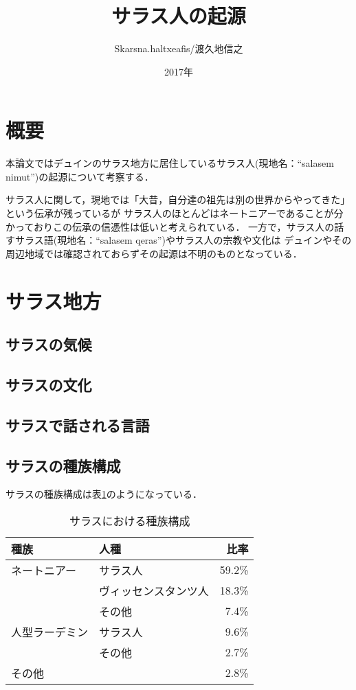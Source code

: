 \documentclass[a4paper,xelatex,ja=standard]{bxjsarticle}
\begin{document}
{
\title{\Huge サラス人の起源}
\author{Skarsna.haltxeafis/渡久地信之}
\date{2017年}
}
\maketitle
\thispagestyle{empty}


\newpage

\tableofcontents

\newpage
{}

\section{概要}
本論文ではデュインのサラス地方に居住しているサラス人(現地名：``salasem nimut'')の起源について考察する．

サラス人に関して，現地では「大昔，自分達の祖先は別の世界からやってきた」という伝承が残っているが
サラス人のほとんどはネートニアーであることが分かっておりこの伝承の信憑性は低いと考えられている．
一方で，サラス人の話すサラス語(現地名：``salasem qeras'')やサラス人の宗教や文化は
デュインやその周辺地域では確認されておらずその起源は不明のものとなっている．

\section{サラス地方}
\subsection{サラスの気候}
\subsection{サラスの文化}
\subsection{サラスで話される言語}

\subsection{サラスの種族構成}
サラスの種族構成は表\ref{calass_species}のようになっている．
\begin{table}[htbp]
 \begin{center}
  \caption{サラスにおける種族構成}
  \label{calass_species}
  \begin{tabular}{llr}
   種族 & 人種 & 比率 \\ \hline \hline
   ネートニアー & サラス人 & 59.2\% \\
   & ヴィッセンスタンツ人 & 18.3\% \\
   & その他 & 7.4\% \\ \hline
   人型ラーデミン & サラス人 & 9.6\% \\
   & その他 & 2.7\% \\ \hline
   その他 & & 2.8\%
 \end{tabular}
\end{center}
\end{table}
\end{document}
